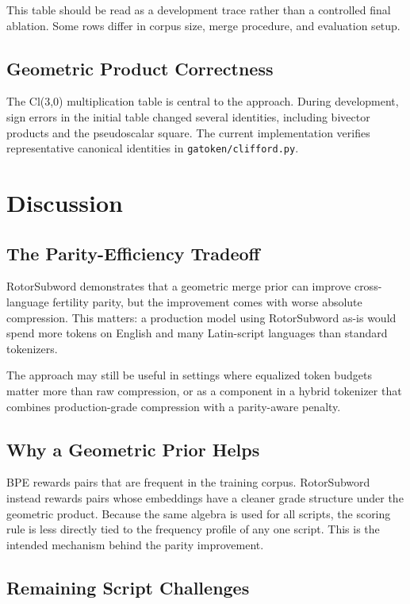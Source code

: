 \documentclass[11pt]{article}
\begin{document}
This table should be read as a development trace rather than a controlled final ablation. Some rows differ in corpus size, merge procedure, and evaluation setup.

\subsection{Geometric Product Correctness}

The Cl(3,0) multiplication table is central to the approach. During development, sign errors in the initial table changed several identities, including bivector products and the pseudoscalar square. The current implementation verifies representative canonical identities in \texttt{gatoken/clifford.py}.

\section{Discussion}

\subsection{The Parity-Efficiency Tradeoff}

RotorSubword demonstrates that a geometric merge prior can improve cross-language fertility parity, but the improvement comes with worse absolute compression. This matters: a production model using RotorSubword as-is would spend more tokens on English and many Latin-script languages than standard tokenizers.

The approach may still be useful in settings where equalized token budgets matter more than raw compression, or as a component in a hybrid tokenizer that combines production-grade compression with a parity-aware penalty.

\subsection{Why a Geometric Prior Helps}

BPE rewards pairs that are frequent in the training corpus. RotorSubword instead rewards pairs whose embeddings have a cleaner grade structure under the geometric product. Because the same algebra is used for all scripts, the scoring rule is less directly tied to the frequency profile of any one script. This is the intended mechanism behind the parity improvement.

\subsection{Remaining Script Challenges}
\end{document}
